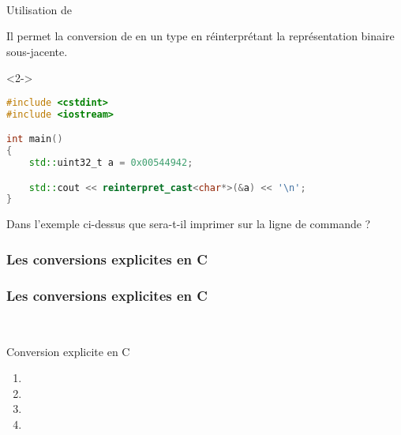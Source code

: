 \documentclass{cppcourses}
\begin{document}
\begin{frame}[fragile]

\frametitle{}

\begin{myfigure}
 \\
\caption{Utilisation de }
\end{myfigure}

Il permet la conversion de \mykeyword{\textcolor{orange}{expression}} en un type \mykeyword{\textcolor{blue}{type cible}} en réinterprétant la représentation binaire sous-jacente.

\begin{example}<2->

\begin{lstlisting}[language = c++]
#include <cstdint>
#include <iostream>

int main()
{
    std::uint32_t a = 0x00544942;

    std::cout << reinterpret_cast<char*>(&a) << '\n';
}
\end{lstlisting}

Dans l'exemple ci-dessus que sera-t-il imprimer sur la ligne de commande ?


\end{example}

\end{frame}

\subsubsection{Les conversions explicites en C}

\begin{frame}

\frametitle{Les conversions explicites en C}

\begin{myfigure}
\mykeyword{(\textcolor{blue}{<type cible>}) \textcolor{orange}{<expression>}} \\
\mykeyword{\textcolor{blue}{<type cible>} (\textcolor{orange}{<expression>})}
\caption{Conversion explicite en C}
\end{myfigure}


\begin{enumerate}
    \item<3-> 
    \item<4-> 
    \item<5-> 
    \item<6-> 
\end{enumerate}

\end{frame}
\end{document}
